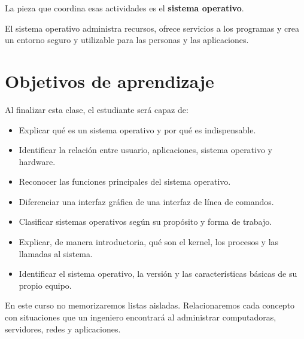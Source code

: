 \documentclass[
  spanish,
  letterpaper,
]{scrbook}
\providecommand{\tightlist}{%
  \setlength{\itemsep}{0pt}\setlength{\parskip}{0pt}}
\begin{document}
La pieza que coordina esas actividades es el \textbf{sistema operativo}.

\begin{tcolorbox}[enhanced jigsaw, arc=.35mm, bottomrule=.15mm, bottomtitle=1mm, breakable, colback=white, colbacktitle=quarto-callout-note-color!10!white, colframe=quarto-callout-note-color-frame, coltitle=black, left=2mm, leftrule=.75mm, opacityback=0, opacitybacktitle=0.6, rightrule=.15mm, title=\textcolor{quarto-callout-note-color}{\faInfo}\hspace{0.5em}{Idea central de la clase}, titlerule=0mm, toprule=.15mm, toptitle=1mm]

El sistema operativo administra recursos, ofrece servicios a los
programas y crea un entorno seguro y utilizable para las personas y las
aplicaciones.

\end{tcolorbox}

\section{Objetivos de aprendizaje}\label{objetivos-de-aprendizaje}

Al finalizar esta clase, el estudiante será capaz de:

\begin{itemize}
\tightlist
\item
  Explicar qué es un sistema operativo y por qué es indispensable.
\item
  Identificar la relación entre usuario, aplicaciones, sistema operativo
  y hardware.
\item
  Reconocer las funciones principales del sistema operativo.
\item
  Diferenciar una interfaz gráfica de una interfaz de línea de comandos.
\item
  Clasificar sistemas operativos según su propósito y forma de trabajo.
\item
  Explicar, de manera introductoria, qué son el kernel, los procesos y
  las llamadas al sistema.
\item
  Identificar el sistema operativo, la versión y las características
  básicas de su propio equipo.
\end{itemize}

\begin{tcolorbox}[enhanced jigsaw, arc=.35mm, bottomrule=.15mm, bottomtitle=1mm, breakable, colback=white, colbacktitle=quarto-callout-tip-color!10!white, colframe=quarto-callout-tip-color-frame, coltitle=black, left=2mm, leftrule=.75mm, opacityback=0, opacitybacktitle=0.6, rightrule=.15mm, title=\textcolor{quarto-callout-tip-color}{\faLightbulb}\hspace{0.5em}{El libro que nos hubiera gustado tener}, titlerule=0mm, toprule=.15mm, toptitle=1mm]

En este curso no memorizaremos listas aisladas. Relacionaremos cada
concepto con situaciones que un ingeniero encontrará al administrar
computadoras, servidores, redes y aplicaciones.

\end{tcolorbox}
\end{document}
